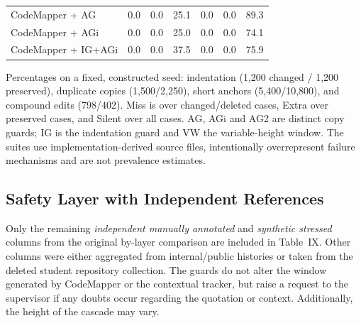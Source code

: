 \documentclass[10pt,conference,letterpaper]{IEEEtran}
\begin{document}
\begin{table}[!t]
\begin{tabular}{lrrrrrr}
CodeMapper + AG & 0.0 & 0.0 & 25.1 & 0.0 & 0.0 & 89.3 \\
CodeMapper + AGi & 0.0 & 0.0 & 25.0 & 0.0 & 0.0 & 74.1 \\
CodeMapper + IG+AGi & 0.0 & 0.0 & 37.5 & 0.0 & 0.0 & 75.9 \\
\hline
\end{tabular}
\parbox{.96\textwidth}{\footnotesize Percentages on a fixed, constructed seed: indentation (1,200 changed / 1,200 preserved), duplicate copies (1,500/2,250), short anchors (5,400/10,800), and compound edits (798/402). Miss is over changed/deleted cases, Extra over preserved cases, and Silent over all cases. AG, AGi and AG2 are distinct copy guards; IG is the indentation guard and VW the variable-height window. The suites use implementation-derived source files, intentionally overrepresent failure mechanisms and are not prevalence estimates.}
\end{table}

\subsection{Safety Layer with Independent References}
Only the remaining \emph{independent manually annotated} and \emph{synthetic stressed} columns from the original by-layer comparison are included in Table~IX. Other columns were either aggregated from internal/public histories or taken from the deleted student repository collection. The guards do not alter the window generated by CodeMapper or the contextual tracker, but raise a request to the supervisor if any doubts occur regarding the quotation or context. Additionally, the height of the cascade may vary.
\end{document}
